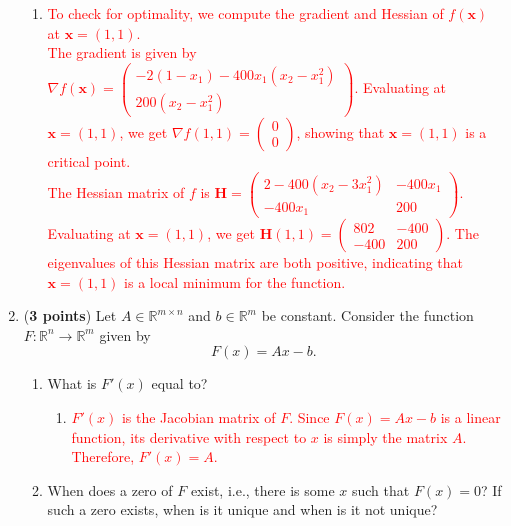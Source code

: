 \documentclass[11pt]{article}
\begin{document}
\begin{enumerate}
    \begin{enumerate}
        \item[\textcolor{red}{}] \textcolor{red}{
            To check for optimality, we compute the gradient and Hessian of $f(\mathbf{x})$ at $\mathbf{x} = (1, 1)$. \\
            The gradient is given by $\nabla f(\mathbf{x}) = \begin{pmatrix} -2(1 - x_1) - 400x_1(x_2 - x_1^2) \\ 200(x_2 - x_1^2) \end{pmatrix}$. Evaluating at $\mathbf{x} = (1, 1)$, we get $\nabla f(1, 1) = \begin{pmatrix} 0 \\ 0 \end{pmatrix}$, showing that $\mathbf{x} = (1, 1)$ is a critical point. \\
            The Hessian matrix of $f$ is $\mathbf{H} = \begin{pmatrix} 2 - 400(x_2 - 3x_1^2) & -400x_1 \\ -400x_1 & 200 \end{pmatrix}$. Evaluating at $\mathbf{x} = (1, 1)$, we get $\mathbf{H}(1, 1) = \begin{pmatrix} 802 & -400 \\ -400 & 200 \end{pmatrix}$. The eigenvalues of this Hessian matrix are both positive, indicating that $\mathbf{x} = (1, 1)$ is a local minimum for the function.
        }
    \end{enumerate}


\item ({\bf 3 points}) Let $A \in \mathbb{R}^{m \times n}$ and $b \in
  \mathbb{R}^m$ be constant.  Consider the function $F \colon
  \mathbb{R}^n \rightarrow \mathbb{R}^m$ given by
  $$
  F(x) = Ax - b.
  $$
  \begin{enumerate}
  \item What is $F'(x)$ equal to?

    \begin{enumerate}
        \item[\textcolor{red}{}] \textcolor{red}{
            $F'(x)$ is the Jacobian matrix of $F$. Since $F(x) = Ax - b$ is a linear function, its derivative with respect to $x$ is simply the matrix $A$. Therefore, $F'(x) = A$.
        }
    \end{enumerate}
  
  \item When does a zero of $F$ exist, i.e., there is some $x$ such that
    $F(x) = 0$?  If such a zero exists, when is it unique and when is it
    not unique?


\end{enumerate}
\end{enumerate}
\end{document}
